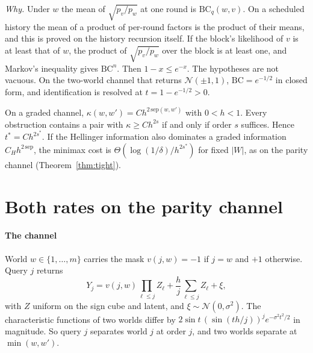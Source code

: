 
\emph{Why.} Under $w$ the mean of $\sqrt{p_{v}/p_{w}}$ at one round is $\mathrm{BC}_{q}(w,v)$. On a
scheduled history the mean of a product of per-round factors is the product of their means, and
this is proved on the history recursion itself. If the block's likelihood of $v$ is at least that
of $w$, the product of $\sqrt{p_{v}/p_{w}}$ over the block is at least one, and Markov's
inequality gives $\mathrm{BC}^{n}$. Then $1-x\le e^{-x}$. The hypotheses are not vacuous. On the
two-world channel that returns $\mathcal N(\pm1,1)$, $\mathrm{BC}=e^{-1/2}$ in closed form, and
identification is resolved at $t=1-e^{-1/2}>0$.


\begin{theorem}
\label{thm:order}
On a graded channel, $\kappa(w,w')=Ch^{2\,\mathrm{sep}(w,w')}$ with $0<h<1$. Every obstruction
contains a pair with $\kappa\ge Ch^{2s}$ if and only if order $s$ suffices. Hence
$t^{*}=Ch^{2s^{*}}$. If the Hellinger information also dominates a graded information
$C_{H}h^{2\,\mathrm{sep}}$, the minimax cost is $\Theta(\log(1/\delta)/h^{2s^{*}})$ for fixed $|W|$, as on
the parity channel (Theorem~\ref{thm:tight}).
\end{theorem}


\section{Both rates on the parity channel}
\label{sec:parity}

\paragraph{The channel} World $w\in\{1,\dots,m\}$ carries the mask $v(j,w)=-1$ if $j=w$ and $+1$
otherwise. Query $j$ returns
\[
Y_{j}=v(j,w)\prod_{\ell\le j}Z_{\ell}+\frac hj\sum_{\ell\le j}Z_{\ell}+\xi,
\]
with $Z$ uniform on the sign cube and latent, and $\xi\sim\mathcal N(0,\sigma^{2})$. The
characteristic functions of two worlds differ by $2\sin t\,(\sin(th/j))^{j}e^{-\sigma^{2}t^{2}/2}$
in magnitude. So query $j$ separates world $j$ at order $j$, and two worlds separate at
$\min(w,w')$.

